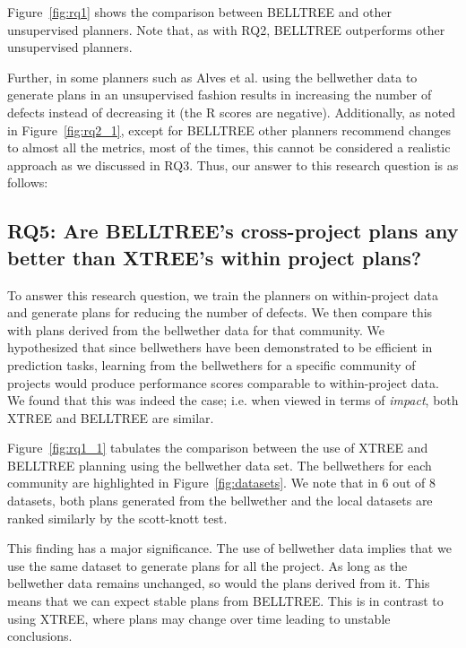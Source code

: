 \documentclass[10pt,journal,compsoc]{IEEEtran}
\newcommand{\fig}[1]{Figure~\ref{fig:#1}}
\begin{document}
\fig{rq1} shows the comparison between BELLTREE and other unsupervised planners. Note that, as with RQ2, BELLTREE outperforms other unsupervised planners. 

Further, in some planners such as Alves et al. using the bellwether data to generate plans in an unsupervised fashion results in increasing the number of defects instead of decreasing it (the R scores are negative). Additionally, as noted in \fig{rq2_1}, except for BELLTREE other planners recommend changes to almost all the metrics, most of the times, this cannot be considered a realistic approach as we discussed in RQ3. Thus, our answer to this research question is as follows:


\subsection*{{\bf RQ5: Are BELLTREE's cross-project plans any better than XTREE's within project plans?}}

To answer this research question, we train the planners on within-project data and generate plans for reducing the number of defects. We then compare this with plans derived from the bellwether data for that community. We hypothesized that since bellwethers have been demonstrated to be efficient in prediction tasks, learning from the bellwethers for a specific community of projects would produce performance scores comparable to within-project data. We found that this was indeed the case; i.e. when viewed in terms of \textit{impact}, both XTREE and BELLTREE are similar.

\fig{rq1_1} tabulates the comparison between the use of XTREE and BELLTREE planning using the bellwether data set. The bellwethers for each community are highlighted in \fig{datasets}. We note that in 6 out of 8 datasets, both plans generated from the bellwether and the local datasets are ranked similarly by the scott-knott test. 

This finding has a major significance. The use of bellwether data implies that we use the same dataset to generate plans for all the project. As long as the bellwether data remains unchanged, so would the plans derived from it. This means that we can expect stable plans from BELLTREE. This is in contrast to
using XTREE, where plans may change over time leading to unstable conclusions.
\end{document}
